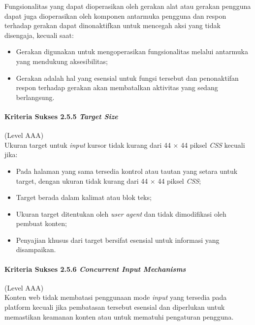 Fungsionalitas yang dapat dioperasikan oleh gerakan alat atau gerakan pengguna dapat juga dioperasikan oleh komponen antarmuka pengguna dan respon terhadap gerakan dapat dinonaktifkan untuk mencegah aksi yang tidak disengaja, kecuali saat:
\begin{itemize}
	\item Gerakan digunakan untuk mengoperasikan fungsionalitas melalui antarmuka yang mendukung aksesibilitas;
	\item Gerakan adalah hal yang esensial untuk fungsi tersebut dan penonaktifan respon terhadap gerakan akan membatalkan aktivitas yang sedang berlangsung.
\end{itemize}

\paragraph{Kriteria Sukses 2.5.5 \textit{Target Size}}
\label{sec:kriteria_sukses_2.5.5}
(Level AAA)\\

Ukuran target untuk \textit{input} kursor tidak kurang dari 44 $\times$ 44 piksel \textit{CSS} kecuali jika:

\begin{itemize}
	\item Pada halaman yang sama tersedia kontrol atau tautan yang setara untuk target, dengan ukuran tidak kurang dari 44 $\times$ 44 piksel \textit{CSS};  
	\item Target berada dalam kalimat atau blok teks;
	\item Ukuran target ditentukan oleh \textit{user agent} dan tidak dimodifikasi oleh pembuat konten;
	\item Penyajian khusus dari target bersifat esensial untuk informasi yang disampaikan.
\end{itemize}

\paragraph{Kriteria Sukses 2.5.6 \textit{Concurrent Input Mechanisms}}
\label{sec:kriteria_sukses_2.5.6}
(Level AAA)\\

Konten web tidak membatasi penggunaan mode \textit{input} yang tersedia pada platform kecuali jika pembatasan tersebut esensial dan diperlukan untuk memastikan keamanan konten atau untuk mematuhi pengaturan pengguna.



